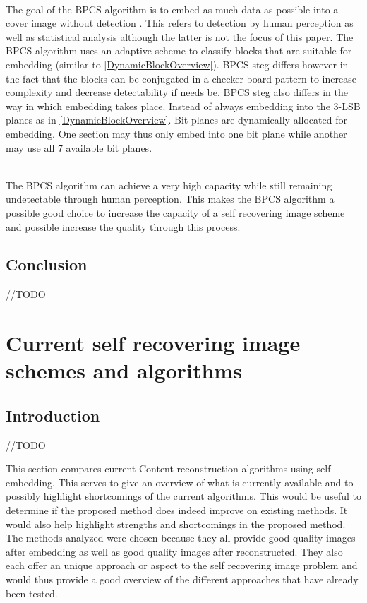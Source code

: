\documentclass[12pt]{article}
\begin{document}
\hspace{0pt} \\
The goal of the BPCS algorithm is to embed as much data as possible into a cover image without detection \cite{beaullieubpcs}.
This refers to detection by human perception as well as statistical analysis although the latter is not the focus of this paper.
The BPCS algorithm uses an adaptive scheme to classify blocks that are suitable for embedding (similar to \ref{DynamicBlockOverview}).
BPCS steg differs however in the fact that the blocks can be conjugated in a checker board pattern to increase complexity and decrease detectability if needs be.
BPCS steg also differs in the way in which embedding takes place.
Instead of always embedding into the 3-LSB planes as in \ref{DynamicBlockOverview}.
Bit planes are dynamically allocated for embedding.
One section may thus only embed into one bit plane while another may use all 7 available bit planes.

\hspace{0pt} \\
The BPCS algorithm can achieve a very high capacity while still remaining undetectable through human perception.
This makes the BPCS algorithm a possible good choice to increase the capacity of a self recovering image scheme and possible increase the quality through this process.

\subsection{Conclusion}
\label{introConclusion}
//TODO 

\section{Current self recovering image schemes and algorithms}

\subsection{Introduction}
//TODO

This section compares current Content reconstruction algorithms using self embedding.
This serves to give an overview of what is currently available and to possibly highlight shortcomings of the current algorithms.
This would be useful to determine if the proposed method does indeed improve on existing methods. 
It would also help highlight strengths and shortcomings in the proposed method.
The methods analyzed were chosen because they all provide good quality images after embedding as well as good quality images after reconstructed.
They also each offer an unique approach or aspect to the self recovering image problem and would thus provide a good overview of the different approaches that have already been tested.
\end{document}
